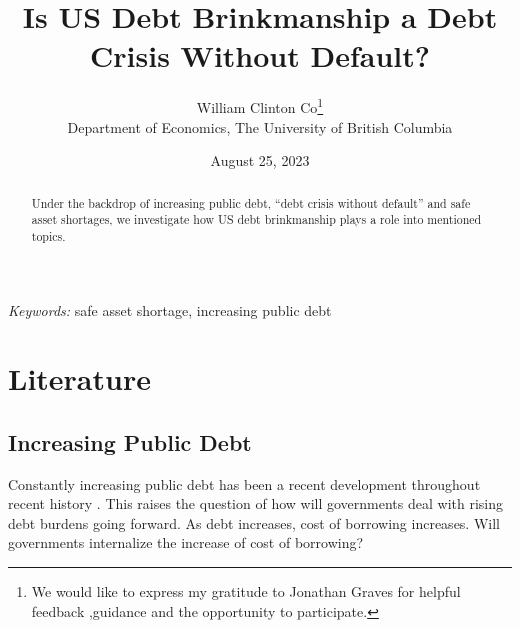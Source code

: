\documentclass[
  12pt]{article}
\begin{document}
\def\spacingset#1{\renewcommand{\baselinestretch}%
{#1}\small\normalsize} \spacingset{1}



\date{August 25, 2023}
\title{\bf Is US Debt Brinkmanship a Debt Crisis Without Default?}
\author{
William Clinton Co\thanks{We would like to express my gratitude to
Jonathan Graves for helpful feedback ,guidance and the opportunity to
participate.}\\
Department of Economics, The University of British Columbia\\
}
\maketitle

\bigskip
\bigskip
\begin{abstract}
Under the backdrop of increasing public debt, ``debt crisis without
default'' and safe asset shortages, we investigate how US debt
brinkmanship plays a role into mentioned topics.
\end{abstract}

\noindent%
{\it Keywords:} safe asset shortage, increasing public debt
\vfill

\newpage
\spacingset{1.9} %
\ifdefined\Shaded\renewenvironment{Shaded}{\begin{tcolorbox}[borderline west={3pt}{0pt}{shadecolor}, breakable, enhanced, interior hidden, boxrule=0pt, frame hidden, sharp corners]}{\end{tcolorbox}}\fi

\hypertarget{sec-l}{%
\section{Literature}\label{sec-l}}

\hypertarget{increasing-public-debt}{%
\subsection{Increasing Public Debt}\label{increasing-public-debt}}

Constantly increasing public debt has been a recent development
throughout recent history \citep{mitchener2023}. This raises the
question of how will governments deal with rising debt burdens going
forward. As debt increases, cost of borrowing increases. Will
governments internalize the increase of cost of borrowing?
\end{document}
